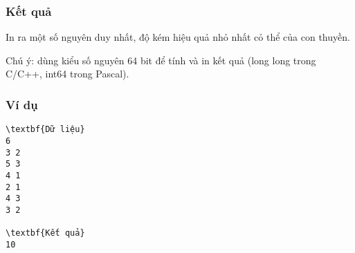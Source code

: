 \subsubsection{   Kết quả  }

   In ra một số nguyên duy nhất, độ kém hiệu quả nhỏ nhất cỏ thể của con thuyền.  

   Chú ý: dùng kiểu số nguyên 64 bit để tính và in kết quả (long long trong C/C++, int64 trong Pascal).  

\subsubsection{   Ví dụ  }
\begin{verbatim}
\textbf{Dữ liệu}
6 
3 2 
5 3 
4 1 
2 1 
4 3 
3 2

\textbf{Kết quả}
10
\end{verbatim}

